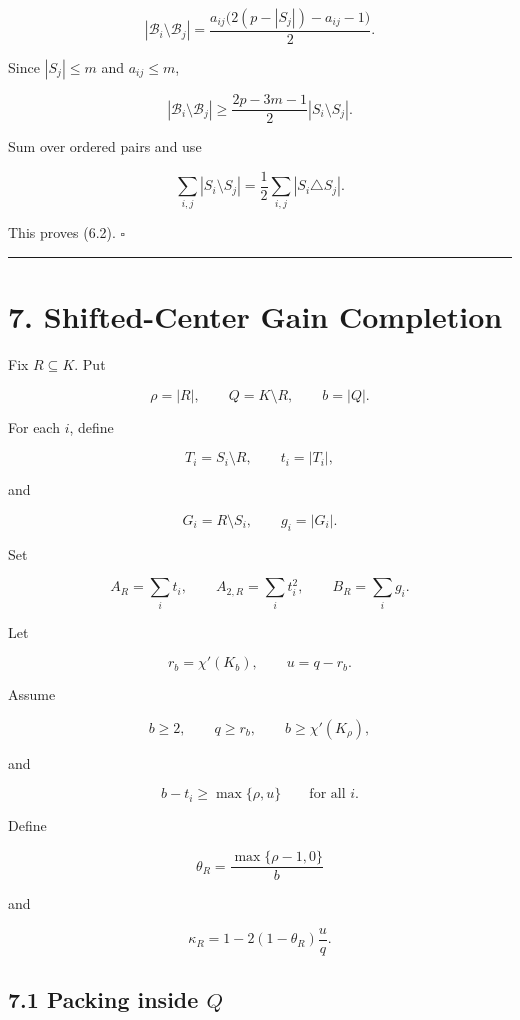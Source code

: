 \documentclass[
  american,
  11pt,
  a4paper,
]{article}
\begin{document}
\[
|\mathcal B_i\setminus\mathcal B_j|
=
\frac{a_{ij}\bigl(2(p-|S_j|)-a_{ij}-1\bigr)}2.
\]

Since \(|S_j|\le m\) and \(a_{ij}\le m\),

\[
|\mathcal B_i\setminus\mathcal B_j|
\ge
\frac{2p-3m-1}{2}|S_i\setminus S_j|.
\]

Sum over ordered pairs and use

\[
\sum_{i,j}|S_i\setminus S_j|
=
\frac12\sum_{i,j}|S_i\triangle S_j|.
\]

This proves (6.2). \(\square\)

\begin{center}\rule{0.5\linewidth}{0.5pt}\end{center}

\section{7. Shifted-Center Gain Completion}\label{shifted-center-gain-completion}

Fix \(R\subseteq K\). Put

\[
\rho=|R|,
\qquad
Q=K\setminus R,
\qquad
b=|Q|.
\]

For each \(i\), define

\[
T_i=S_i\setminus R,
\qquad
t_i=|T_i|,
\]

and

\[
G_i=R\setminus S_i,
\qquad
g_i=|G_i|.
\]

Set

\[
A_R=\sum_i t_i,
\qquad
A_{2,R}=\sum_i t_i^2,
\qquad
B_R=\sum_i g_i.
\]

Let

\[
r_b=\chi'(K_b),
\qquad
u=q-r_b.
\]

Assume

\[
b\ge2,
\qquad
q\ge r_b,
\qquad
b\ge\chi'(K_\rho),
\tag{7.1}
\]

and

\[
b-t_i\ge\max\{\rho,u\}
\qquad
\text{for all }i.
\tag{7.2}
\]

Define

\[
\theta_R=\frac{\max\{\rho-1,0\}}{b}
\]

and

\[
\kappa_R
=
1-2(1-\theta_R)\frac{u}{q}.
\tag{7.3}
\]

\subsection{\texorpdfstring{7.1 Packing inside \(Q\)}{7.1 Packing inside Q}}\label{packing-inside-q}
\end{document}

